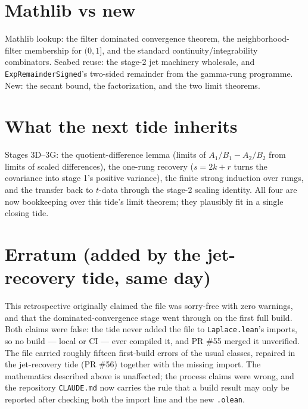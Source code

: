 \documentclass[11pt]{article}
\begin{document}
\section{Mathlib vs new}

Mathlib lookup: the filter dominated convergence theorem, the
neighborhood-filter membership for $(0,1]$, and the standard
continuity/integrability combinators. Seabed reuse: the stage-2 jet
machinery wholesale, and \texttt{ExpRemainderSigned}'s two-sided
remainder from the gamma-rung programme. New: the secant bound, the
factorization, and the two limit theorems.

\section{What the next tide inherits}

Stages 3D--3G: the quotient-difference lemma (limits of
$A_1/B_1 - A_2/B_2$ from limits of scaled differences), the one-rung
recovery ($s = 2k + r$ turns the covariance into stage 1's positive
variance), the finite strong induction over rungs, and the transfer
back to $t$-data through the stage-2 scaling identity. All four are
now bookkeeping over this tide's limit theorem; they plausibly fit in
a single closing tide.

\section*{Erratum (added by the jet-recovery tide, same day)}

This retrospective originally claimed the file was sorry-free with
zero warnings, and that the dominated-convergence stage went
through on the first full build. Both claims were false: the tide never added
the file to \texttt{Laplace.lean}'s imports, so no build --- local or
CI --- ever compiled it, and PR \#55 merged it unverified. The file
carried roughly fifteen first-build errors of the usual classes,
repaired in the jet-recovery tide (PR \#56) together with the missing
import. The mathematics described above is unaffected; the process
claims were wrong, and the repository \texttt{CLAUDE.md} now carries
the rule that a build result may only be reported after checking both
the import line and the new \texttt{.olean}.
\end{document}

